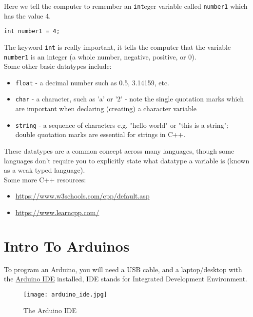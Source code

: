 \documentclass[../TinyBot.tex]{subfiles}
\begin{document}
Here we tell the computer to remember an \lstinline[]!int!eger variable called \lstinline[]!number1! which has the value 4.
\begin{lstlisting}
int number1 = 4;
\end{lstlisting}

The keyword \lstinline[]!int! is really important, it tells the computer that the variable \lstinline[]!number1! is an integer (a whole number, negative, positive, or 0). \\

Some other basic datatypes include:
\begin{itemize}[label={$\triangleright$}]
  \item \lstinline[]!float! - a decimal number such as 0.5, 3.14159, etc. 
  \item \lstinline[]!char! - a character, such as 'a' or '2' - note the single quotation marks which are important when declaring (creating) a character variable
  \item \lstinline[]!string! - a sequence of characters e.g. "hello world" or "this is a string"; double quotation marks are essential for strings in C++. 
\end{itemize}

These datatypes are a common concept across many languages, though some languages don't require you to explicitly state what datatype a variable is (known as a weak typed language). \\

Some more C++ resources:
\begin{itemize}[label={$\triangleright$}]
  \item \href{https://www.w3schools.com/cpp/default.asp}{https://www.w3schools.com/cpp/default.asp}
  \item \href{https://www.learncpp.com/}{https://www.learncpp.com/}
\end{itemize}

\section{Intro To Arduinos} \label{sec:introarduino}

To program an Arduino, you will need a USB cable, and a laptop/desktop with the \href{https://www.arduino.cc/en/software}{Arduino IDE} installed, IDE stands for Integrated Development Environment. 



\begin{figure}[h]
    \centering
    \texttt{[image: arduino\_ide.jpg]}
    \caption{The Arduino IDE}
\end{figure}
\end{document}
